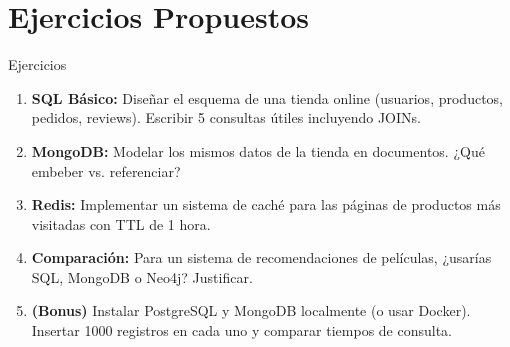 \documentclass[aspectratio=169]{beamer}
\begin{document}
\section{Ejercicios Propuestos}

\begin{frame}{Ejercicios}
    \begin{enumerate}
        \setlength\itemsep{0.6em}
        \item \textbf{SQL Básico:} Diseñar el esquema de una tienda online (usuarios, productos, pedidos, reviews). Escribir 5 consultas útiles incluyendo JOINs.
        
        \item \textbf{MongoDB:} Modelar los mismos datos de la tienda en documentos. ¿Qué embeber vs. referenciar?
        
        \item \textbf{Redis:} Implementar un sistema de caché para las páginas de productos más visitadas con TTL de 1 hora.
        
        \item \textbf{Comparación:} Para un sistema de recomendaciones de películas, ¿usarías SQL, MongoDB o Neo4j? Justificar.
        
        \item \textbf{(Bonus)} Instalar PostgreSQL y MongoDB localmente (o usar Docker). Insertar 1000 registros en cada uno y comparar tiempos de consulta.
    \end{enumerate}
\end{frame}
\end{document}
